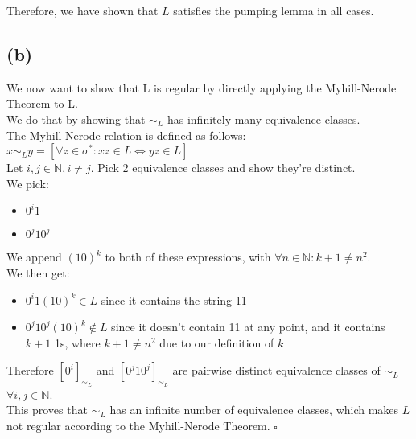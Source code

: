 Therefore, we have shown that \( L \) satisfies the pumping lemma in all cases.

\subsection{(b)}
We now want to show that L is regular by directly applying the Myhill-Nerode Theorem to L.\\
We do that by showing that $\sim_{L}$ has infinitely many equivalence classes.\\
The Myhill-Nerode relation is defined as follows:\\
$x\sim_{L}y= [\forall z \in \sigma^{\ast}: xz \in L \Leftrightarrow yz \in L]$\\
Let $i,j \in \mathbb{N}, i \neq j$. Pick 2 equivalence classes and show they're distinct.\\
We pick:
\vspace{-5mm}
\begin{itemize}
    \item $0^{i}1$
    \item $0^{j}10^{j}$
\end{itemize}
\vspace{-5mm}
We append $(10)^{k}$ to both of these expressions, with $\forall n \in \mathbb{N}: k+1 \neq n^{2}$.\\
We then get:
\vspace{-5mm}
\begin{itemize}
    \item $0^{i}1(10)^k \in L$ since it contains the string 11
    \item $0^{j}10^{j}(10)^k \notin L$ since it doesn't contain 11 at any point, and it contains $k+1$ 1s, where $k+1 \neq n^{2}$ due to our definition of $k$
\end{itemize}
\vspace{-5mm}
Therefore $[0^{i}]_{\sim_{L}}$ and $[0^{j}10^{j}]_{\sim_{L}}$ are pairwise distinct equivalence classes of $\sim_{L}$ $\forall i,j \in \mathbb{N}$.\\
This proves that $\sim_{L}$ has an infinite number of equivalence classes, which makes $L$ not regular according to the Myhill-Nerode Theorem. $\square$



